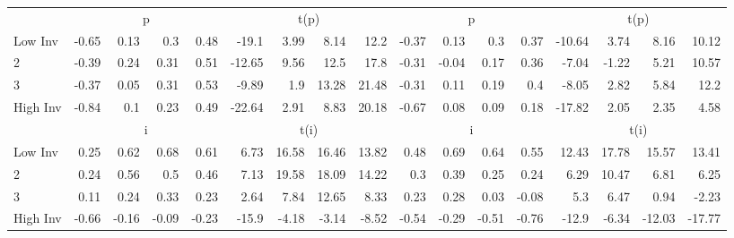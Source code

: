 \begin{table}[!ht]
\begin{tabular}{lrrrrrrrrrrrrrrrr}
  
    
      & \multicolumn{4}{c}{p} & \multicolumn{4}{c}{t(p)}
    
      & \multicolumn{4}{c}{p} & \multicolumn{4}{c}{t(p)}
    
    \\
      \cmidrule(r){2-5} \cmidrule(r){6-9} \cmidrule(r){10-13} \cmidrule(r){14-17}

    Low Inv   & -0.65  & 0.13  & 0.3  & 0.48  & -19.1  & 3.99  & 8.14  & 12.2  & -0.37  & 0.13  & 0.3  & 0.37  & -10.64  & 3.74  & 8.16  & 10.12  \\
           2  & -0.39  & 0.24  & 0.31  & 0.51  & -12.65  & 9.56  & 12.5  & 17.8  & -0.31  & -0.04  & 0.17  & 0.36  & -7.04  & -1.22  & 5.21  & 10.57  \\
           3  & -0.37  & 0.05  & 0.31  & 0.53  & -9.89  & 1.9  & 13.28  & 21.48  & -0.31  & 0.11  & 0.19  & 0.4  & -8.05  & 2.82  & 5.84  & 12.2  \\
    High Inv  & -0.84  & 0.1  & 0.23  & 0.49  & -22.64  & 2.91  & 8.83  & 20.18  & -0.67  & 0.08  & 0.09  & 0.18  & -17.82  & 2.05  & 2.35  & 4.58  \\

  
    
      & \multicolumn{4}{c}{i} & \multicolumn{4}{c}{t(i)}
    
      & \multicolumn{4}{c}{i} & \multicolumn{4}{c}{t(i)}
    
    \\
      \cmidrule(r){2-5} \cmidrule(r){6-9} \cmidrule(r){10-13} \cmidrule(r){14-17}

    Low Inv   & 0.25  & 0.62  & 0.68  & 0.61  & 6.73  & 16.58  & 16.46  & 13.82  & 0.48  & 0.69  & 0.64  & 0.55  & 12.43  & 17.78  & 15.57  & 13.41  \\
           2  & 0.24  & 0.56  & 0.5  & 0.46  & 7.13  & 19.58  & 18.09  & 14.22  & 0.3  & 0.39  & 0.25  & 0.24  & 6.29  & 10.47  & 6.81  & 6.25  \\
           3  & 0.11  & 0.24  & 0.33  & 0.23  & 2.64  & 7.84  & 12.65  & 8.33  & 0.23  & 0.28  & 0.03  & -0.08  & 5.3  & 6.47  & 0.94  & -2.23  \\
    High Inv  & -0.66  & -0.16  & -0.09  & -0.23  & -15.9  & -4.18  & -3.14  & -8.52  & -0.54  & -0.29  & -0.51  & -0.76  & -12.9  & -6.34  & -12.03  & -17.77  \\

  

  \bottomrule
\end{tabular}
\label{tbl:32_Size_OP_Inv_FF2015}
\end{table}